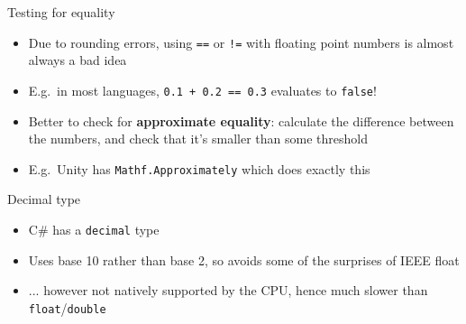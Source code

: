 \begin{frame}[fragile]{Testing for equality}
	\begin{itemize}
		\pause\item Due to rounding errors, using \lstinline{==} or \lstinline{!=} with floating point numbers is almost always a bad idea
		\pause\item E.g.\ in most languages, \lstinline{0.1 + 0.2 == 0.3} evaluates to \lstinline{false}!
		\pause\item Better to check for \textbf{approximate equality}: calculate the difference between the numbers,
			and check that it's smaller than some threshold
		\pause\item E.g.\ Unity has \lstinline{Mathf.Approximately} which does exactly this
	\end{itemize}
\end{frame}

\begin{frame}[fragile]{Decimal type}
	\begin{itemize}
		\pause\item C\# has a \lstinline{decimal} type
		\pause\item Uses base 10 rather than base 2, so avoids some of the surprises of IEEE float
		\pause\item ... however not natively supported by the CPU, hence much slower than \lstinline{float}/\lstinline{double}
	\end{itemize}
\end{frame}